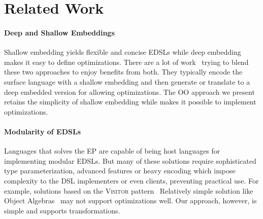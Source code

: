 \section{Related Work}

\paragraph{Deep and Shallow Embeddings}
Shallow embedding yields flexible and concise EDSLs while deep embedding makes
it easy to define optimizations.
There are a lot of work~\cite{svenningsson2012combining,
  Jovanovic:2014:YCD:2658761.2658771, scherr2014implicit} trying to blend these two
approaches to enjoy benefits from both.
They typically encode the surface language with a shallow embedding and
then generate or translate to a deep embedded version for allowing optimizations.
The OO approach we present retains the simplicity of shallow embedding while
makes it possible to implement optimizations.

\paragraph{Modularity of EDSLs}
Languages that solves the EP are capable of being host languages for
implementing modular EDSLs. But many of these solutions require sophisticated
type parameterization, advanced features or heavy encoding which impose
complexity to the DSL implementers or even clients, preventing practical use.
For example, solutions based on the \textsc{Visitor}
pattern~\cite{oliveira09modular,hofer2010modular} %
Relatively simple solution like Object Algebras~\cite{bruno12oa} may not support
optimizations well.
Our approach, however, is simple and supports transformations.
